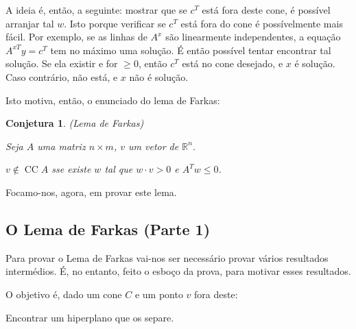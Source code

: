 \documentclass{article}
\DeclareMathOperator{\CC}{CC}
\newcommand{\R}{\mathbb{R}}
\newtheorem{conjetura}{Conjetura}
\theoremstyle{definition}
\begin{document}
	A ideia é, então, a seguinte: mostrar que se $c^T$ está fora deste cone, é possível arranjar tal $w$. Isto porque verificar se $c^T$ está fora do cone é possívelmente mais fácil. Por exemplo, se as linhas de $A^x$ são linearmente independentes, a equação $A^{xT} y = c^T$ tem no máximo uma solução. É então possível tentar encontrar tal solução. Se ela existir e for $\geq 0$, então $c^T$ está no cone desejado, e $x$ é solução. Caso contrário, não está, e $x$ não é solução.
	
	Isto motiva, então, o enunciado do lema de Farkas:
	
	\begin{conjetura} (Lema de Farkas)
	
	Seja $A$ uma matriz $n \times m$, $v$ um vetor de $\R^n$.
	
	$v \not\in \CC A$ sse existe $w$ tal que $w \cdot v > 0$ e $A^T w \leq 0$.
	\end{conjetura}
	
	Focamo-nos, agora, em provar este lema.
	
	\subsection{O Lema de Farkas (Parte 1)}
	
	Para provar o Lema de Farkas vai-nos ser necessário provar vários resultados intermédios. É, no entanto, feito o esboço da prova, para motivar esses resultados.
	
	O objetivo é, dado um cone $C$ e um ponto $v$ fora deste:
	
	
	Encontrar um hiperplano que os separe.
	
	
\end{document}
